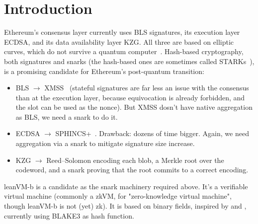 \section{Introduction}\label{sec:intro}

Ethereum's consensus layer currently uses BLS signatures, its execution layer ECDSA, and its data availability layer KZG. All three are based on elliptic curves, which do not survive a quantum computer~\cite{shor}. Hash-based cryptography, both signatures and snarks (the hash-based ones are sometimes called STARKs~\cite{stark}), is a promising candidate for Ethereum's post-quantum transition:
\begin{itemize}[itemsep=1pt,topsep=3pt]
\item BLS $\to$ XMSS~\cite{rfc8391} (stateful signatures are far less an issue with the consensus than at the execution layer, because equivocation is already forbidden, and the slot can be used as the nonce). But XMSS dosn't have native aggregation as BLS, we need a snark to do it.
\item ECDSA $\to$ SPHINCS+~\cite{sphincs}. Drawback: dozens of time bigger. Again, we need aggregation via a snark to mitigate signature size increase.
\item KZG $\to$ Reed--Solomon encoding each blob, a Merkle root over the codeword, and a snark proving that the root commits to a correct encoding.
\end{itemize}

\vspace{4mm}

leanVM-b is a candidate as the snark machinery required above. It's a verifiable virtual machine (commonly a zkVM, for "zero-knowledge virtual machine", though leanVM-b is not (yet) zk). It is based on binary fields, inspired by \cite{DP26} and \cite{Flock26}, currently using BLAKE3 \cite{blake3} as hash function.
